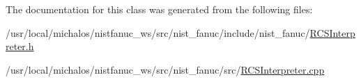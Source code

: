 The documentation for this class was generated from the following files\-:\begin{DoxyCompactItemize}
\item 
/usr/local/michalos/nistfanuc\-\_\-ws/src/nist\-\_\-fanuc/include/nist\-\_\-fanuc/\hyperlink{RCSInterpreter_8h}{R\-C\-S\-Interpreter.\-h}\item 
/usr/local/michalos/nistfanuc\-\_\-ws/src/nist\-\_\-fanuc/src/\hyperlink{RCSInterpreter_8cpp}{R\-C\-S\-Interpreter.\-cpp}\end{DoxyCompactItemize}
